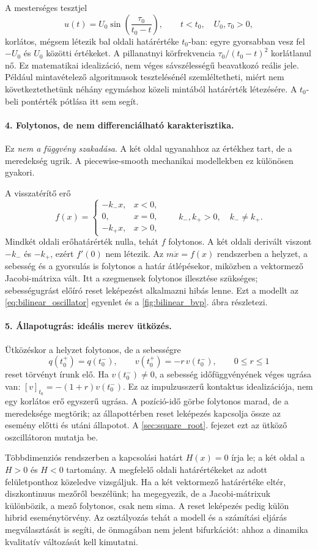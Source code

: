  A mesterséges tesztjel
\[
u(t)=U_0\sin\!\left(\frac{\tau_0}{t_0-t}\right),\qquad t<t_0,
\quad U_0,\tau_0>0,
\]
korlátos, mégsem létezik bal oldali határértéke $t_0$-ban: egyre gyorsabban vesz fel $-U_0$ és $U_0$ közötti értékeket. A pillanatnyi körfrekvencia $\tau_0/(t_0-t)^2$ korlátlanul nő. Ez matematikai idealizáció, nem véges sávszélességű beavatkozó reális jele. Például mintavételező algoritmusok tesztelésénél szemléltetheti, miért nem következtethetünk néhány egymáshoz közeli mintából határérték létezésére. A $t_0$-beli pontérték pótlása itt sem segít.
\exampleend

\paragraph{4. Folytonos, de nem differenciálható karakterisztika.}
Ez \emph{nem a függvény szakadása}. A két oldal ugyanahhoz az értékhez tart, de a meredekség ugrik. A piecewise-smooth mechanikai modellekben ez különösen gyakori.

 A visszatérítő erő
\[
f(x)=\begin{cases}-k_-x,&x<0,\\0,&x=0,\\-k_+x,&x>0,\end{cases}
\qquad k_-,k_+>0,\quad k_-\neq k_+.
\]
Mindkét oldali erőhatárérték nulla, tehát $f$ folytonos. A két oldali derivált viszont $-k_-$ és $-k_+$, ezért $f'(0)$ nem létezik. Az $m\ddot x=f(x)$ rendszerben a helyzet, a sebesség és a gyorsulás is folytonos a határ átlépésekor, miközben a vektormező Jacobi-mátrixa vált. Itt a szegmensek folytonos illesztése szükséges; sebességugrást előíró reset leképezést alkalmazni hibás lenne. Ezt a modellt az \eqref{eq:bilinear_oscillator} egyenlet és a \ref{fig:bilinear_bvp}. ábra részletezi.
\exampleend

\paragraph{5. Állapotugrás: ideális merev ütközés.}
Ütközéskor a helyzet folytonos, de a sebességre
\[
q(t_0^+)=q(t_0^-),\qquad
v(t_0^+)=-r\,v(t_0^-),\qquad 0\leq r\leq1
\]
reset törvényt írunk elő. Ha $v(t_0^-)\neq0$, a sebesség időfüggvényének véges ugrása van: $[v]_{t_0}=-(1+r)v(t_0^-)$. Ez az impulzusszerű kontaktus idealizációja, nem egy korlátos erő egyszerű ugrása. A pozíció-idő görbe folytonos marad, de a meredeksége megtörik; az állapottérben reset leképezés kapcsolja össze az esemény előtti és utáni állapotot. A \ref{sec:square_root}. fejezet ezt az ütköző oszcillátoron mutatja be.

Többdimenziós rendszerben a kapcsolási határt $H(x)=0$ írja le; a két oldal a $H>0$ és $H<0$ tartomány. A megfelelő oldali határértékeket az adott felületponthoz közeledve vizsgáljuk. Ha a két vektormező határértéke eltér, diszkontinuus mezőről beszélünk; ha megegyezik, de a Jacobi-mátrixuk különbözik, a mező folytonos, csak nem sima. A reset leképezés pedig külön hibrid eseménytörvény. Az osztályozás tehát a modell és a számítási eljárás megválasztását is segíti, de önmagában nem jelent bifurkációt: ahhoz a dinamika kvalitatív változását kell kimutatni.
